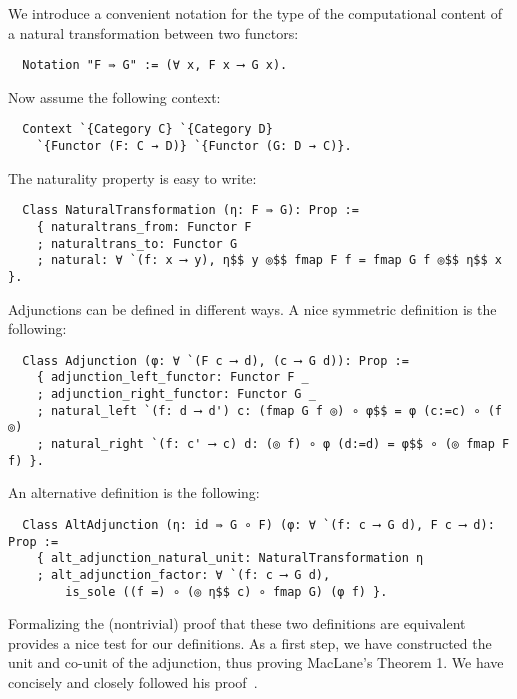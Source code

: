 \documentclass[a4paper,10pt,runningheads]{llncs}
\begin{document}
We introduce a convenient notation for the type of the computational content of a natural transformation between two functors:
\begin{lstlisting}
  Notation "F ⇛ G" := (∀ x, F x ⟶ G x).
\end{lstlisting}
Now assume the following context:
\begin{lstlisting}
  Context `{Category C} `{Category D}
    `{Functor (F: C → D)} `{Functor (G: D → C)}.
\end{lstlisting}
The naturality property is easy to write:
\begin{lstlisting}
  Class NaturalTransformation (η: F ⇛ G): Prop :=
    { naturaltrans_from: Functor F
    ; naturaltrans_to: Functor G
    ; natural: ∀ `(f: x ⟶ y), η$$ y ◎$$ fmap F f = fmap G f ◎$$ η$$ x }.
\end{lstlisting}



Adjunctions can be defined in different ways. A nice symmetric definition is the following:
\begin{lstlisting}
  Class Adjunction (φ: ∀ `(F c ⟶ d), (c ⟶ G d)): Prop :=
    { adjunction_left_functor: Functor F _
    ; adjunction_right_functor: Functor G _
    ; natural_left `(f: d ⟶ d') c: (fmap G f ◎) ∘ φ$$ = φ (c:=c) ∘ (f ◎)
    ; natural_right `(f: c' ⟶ c) d: (◎ f) ∘ φ (d:=d) = φ$$ ∘ (◎ fmap F f) }.
\end{lstlisting}
An alternative definition is the following:
\begin{lstlisting}
  Class AltAdjunction (η: id ⇛ G ∘ F) (φ: ∀ `(f: c ⟶ G d), F c ⟶ d): Prop :=
    { alt_adjunction_natural_unit: NaturalTransformation η
    ; alt_adjunction_factor: ∀ `(f: c ⟶ G d),
        is_sole ((f =) ∘ (◎ η$$ c) ∘ fmap G) (φ f) }.
\end{lstlisting}
Formalizing the (nontrivial) proof that these two definitions are equivalent provides a nice test for our definitions. As a first step, we have constructed the unit and co-unit of the adjunction, thus proving MacLane's Theorem 1. We have concisely and closely followed his proof~\cite{CatWork}. %
\end{document}
